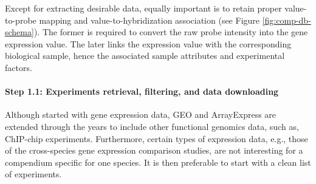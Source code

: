 %
%
%
Except for extracting desirable data, equally important is to retain proper
value-to-probe mapping and value-to-hybridization association (see
Figure \ref{fig:comp-db-schema}).
%
The former is required to convert the raw probe intensity into the gene
expression value.
%
The later links the expression value with the corresponding biological sample,
hence the associated sample attributes and experimental factors.




\paragraph{Step 1.1: Experiments retrieval, filtering, and data downloading}

Although started with gene expression data, GEO and ArrayExpress are
extended through the years to include other functional genomics data,
such as, ChIP-chip experiments.
%
Furthermore, certain types of expression data, e.g., those of the
cross-species gene expression comparison studies, are not interesting
for a compendium specific for one species.
%
It is then preferable to start with a clean list of experiments.




